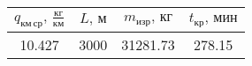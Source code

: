 \begin{tabular}{|c|c|c|c|}
\hline
$q_{км\, ср},\, \frac{кг}{км}$ & $L,\, м$ & $m_{изр},\, кг$ & $t_{кр},\, мин$ \\ 
\hline
10.427 & 3000 & 31281.73 & 278.15 \\ 
\hline
\end{tabular}